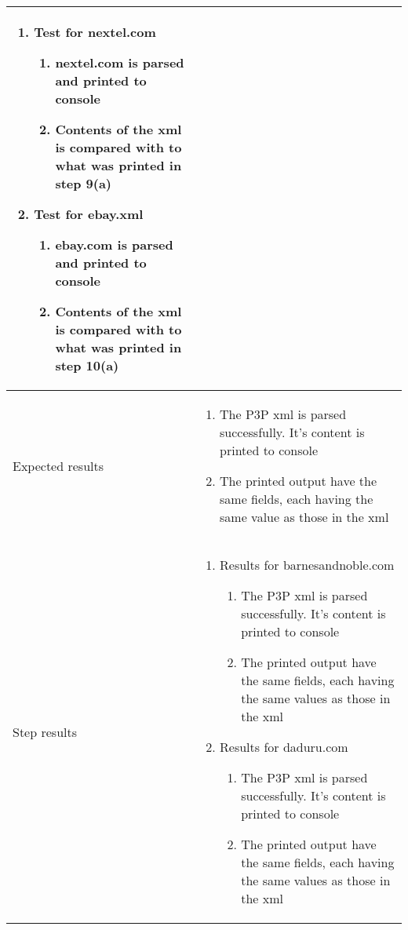 \documentclass[10pt]{article}
\begin{document}
\begin{center}
\begin{longtable}{ | p{4cm} | p{10cm} | }
\begin{enumerate}
							\item Test for nextel.com
							\begin{enumerate}
								\item nextel.com is parsed and printed to console
								\item Contents of the xml is compared with to what was printed in step 9(a)
							\end{enumerate}

							\item Test for ebay.xml
							\begin{enumerate}
								\item ebay.com is parsed and printed to console
								\item Contents of the xml is compared with to what was printed in step 10(a)
							\end{enumerate}
						\end{enumerate} \\ [3pt] \hline
			
			Expected results &	\begin{enumerate}
							\item The P3P xml is parsed successfully. It's content is printed to console
							\item The printed output have the same fields, each having the same value as those in the xml
						\end{enumerate}
							 \\  [3pt] \hline

			Step results & 	\begin{enumerate}
							\item Results for barnesandnoble.com
							\begin{enumerate}
								\item The P3P xml is parsed successfully. It's content is printed to console
								\item The printed output have the same fields, each having the same values as those in the xml
							\end{enumerate}

							\item Results for daduru.com
							\begin{enumerate}
								\item The P3P xml is parsed successfully. It's content is printed to console
								\item The printed output have the same fields, each having the same values as those in the xml
							\end{enumerate}


\end{enumerate}
\end{longtable}
\end{center}
\end{document}
